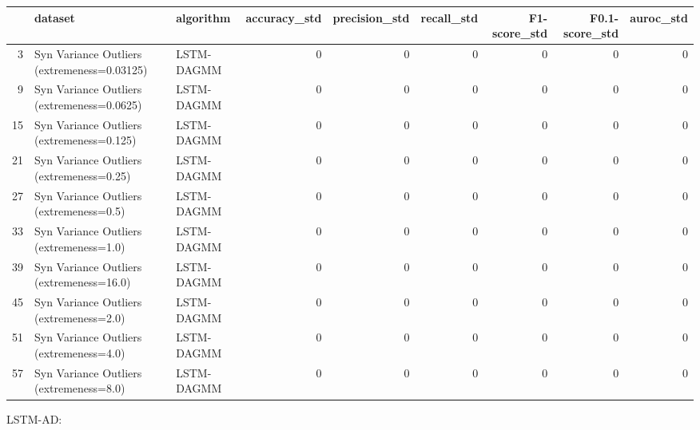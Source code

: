 \begin{tabular}{rllrrrrrr}
\hline
    & dataset                                     & algorithm   &   accuracy\_std &   precision\_std &   recall\_std &   F1-score\_std &   F0.1-score\_std &   auroc\_std \\
\hline
  3 & Syn Variance Outliers (extremeness=0.03125) & LSTM-DAGMM  &              0 &               0 &            0 &              0 &                0 &           0 \\
  9 & Syn Variance Outliers (extremeness=0.0625)  & LSTM-DAGMM  &              0 &               0 &            0 &              0 &                0 &           0 \\
 15 & Syn Variance Outliers (extremeness=0.125)   & LSTM-DAGMM  &              0 &               0 &            0 &              0 &                0 &           0 \\
 21 & Syn Variance Outliers (extremeness=0.25)    & LSTM-DAGMM  &              0 &               0 &            0 &              0 &                0 &           0 \\
 27 & Syn Variance Outliers (extremeness=0.5)     & LSTM-DAGMM  &              0 &               0 &            0 &              0 &                0 &           0 \\
 33 & Syn Variance Outliers (extremeness=1.0)     & LSTM-DAGMM  &              0 &               0 &            0 &              0 &                0 &           0 \\
 39 & Syn Variance Outliers (extremeness=16.0)    & LSTM-DAGMM  &              0 &               0 &            0 &              0 &                0 &           0 \\
 45 & Syn Variance Outliers (extremeness=2.0)     & LSTM-DAGMM  &              0 &               0 &            0 &              0 &                0 &           0 \\
 51 & Syn Variance Outliers (extremeness=4.0)     & LSTM-DAGMM  &              0 &               0 &            0 &              0 &                0 &           0 \\
 57 & Syn Variance Outliers (extremeness=8.0)     & LSTM-DAGMM  &              0 &               0 &            0 &              0 &                0 &           0 \\
\hline
\end{tabular}

LSTM-AD:


